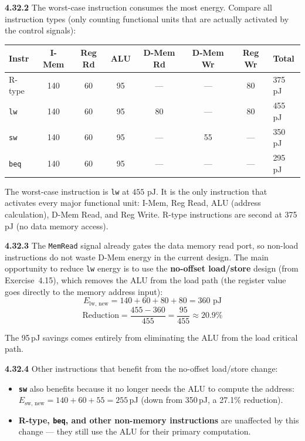 \medskip\noindent\textbf{4.32.2}
The worst-case instruction consumes the most energy.  Compare all instruction
types (only counting functional units that are actually activated by the
control signals):

\begin{center}
\begin{tabular}{lccccccl}
\toprule
\textbf{Instr} & \textbf{I-Mem} & \textbf{Reg Rd} & \textbf{ALU} &
\textbf{D-Mem Rd} & \textbf{D-Mem Wr} & \textbf{Reg Wr} & \textbf{Total} \\
\midrule
R-type & 140 & 60 & 95 & --- & --- & 80 & 375 pJ \\
\texttt{lw} & 140 & 60 & 95 & 80 & --- & 80 & 455 pJ \\
\texttt{sw} & 140 & 60 & 95 & --- & 55 & --- & 350 pJ \\
\texttt{beq} & 140 & 60 & 95 & --- & --- & --- & 295 pJ \\
\bottomrule
\end{tabular}
\end{center}

\noindent The worst-case instruction is \texttt{lw} at $\boxed{455 \text{ pJ}}$.
It is the only instruction that activates every major functional unit: I-Mem,
Reg Read, ALU (address calculation), D-Mem Read, and Reg Write.  R-type
instructions are second at 375\,pJ (no data memory access).

\medskip\noindent\textbf{4.32.3}
The \texttt{MemRead} signal already gates the data memory read port, so
non-load instructions do not waste D-Mem energy in the current design.
The main opportunity to reduce \texttt{lw} energy is to use the
\textbf{no-offset load/store} design (from Exercise~4.15), which removes the
ALU from the load path (the register value goes directly to the memory address
input):
\[
E_{\text{lw, new}} = 140 + 60 + 80 + 80 = 360 \text{ pJ}
\]
\[
\text{Reduction} = \frac{455 - 360}{455} = \frac{95}{455} \approx 20.9\%
\]

\noindent The 95\,pJ savings comes entirely from eliminating the ALU from the
load critical path.

\medskip\noindent\textbf{4.32.4}
Other instructions that benefit from the no-offset load/store change:

\begin{itemize}
\item \textbf{\texttt{sw}} also benefits because it no longer needs the ALU to
      compute the address:
      $E_{\text{sw, new}} = 140 + 60 + 55 = 255$\,pJ (down from 350\,pJ,
      a 27.1\% reduction).

\item \textbf{R-type, \texttt{beq}, and other non-memory instructions} are
      unaffected by this change --- they still use the ALU for their primary
      computation.
\end{itemize}

